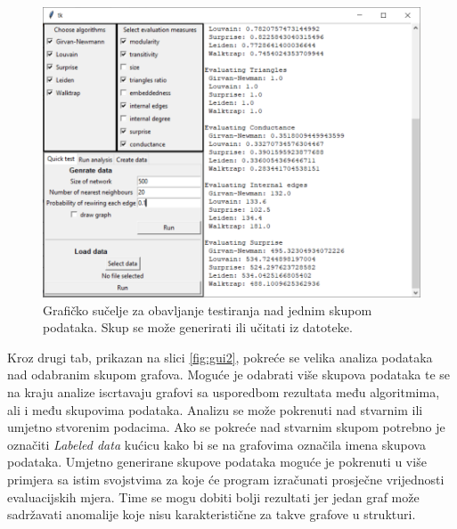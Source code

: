 \documentclass[times, utf8, diplomski]{fer}
\begin{document}
\begin{figure}
	\includegraphics[width=\linewidth]{images/gui-quick.png}
	\caption{Grafičko sučelje za obavljanje testiranja nad jednim skupom podataka. Skup se može generirati ili učitati iz datoteke.}
	\label{fig:gui1}
\end{figure}


Kroz drugi tab, prikazan na slici \ref{fig:gui2}, pokreće se velika analiza podataka nad odabranim skupom grafova. Moguće je odabrati više skupova podataka te se na kraju analize iscrtavaju grafovi sa usporedbom rezultata među algoritmima, ali i među skupovima podataka. Analizu se može pokrenuti nad stvarnim ili umjetno stvorenim podacima. Ako se pokreće nad stvarnim skupom potrebno je označiti \textit{Labeled data} kućicu kako bi se na grafovima označila imena skupova podataka. Umjetno generirane skupove podataka moguće je pokrenuti u više primjera sa istim svojstvima za koje će program izračunati prosječne vrijednosti evaluacijskih mjera. Time se mogu dobiti bolji rezultati jer jedan graf može sadržavati anomalije koje nisu karakteristične za takve grafove u strukturi.
\end{document}
